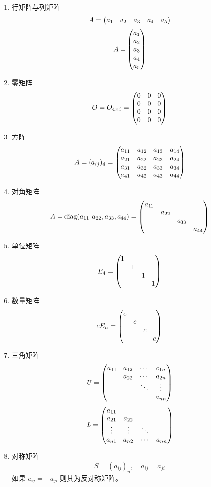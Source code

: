 \documentclass{ctexbook}
\begin{document}
\begin{definition}[常见矩阵]
    \begin{enumerate}
        \item 行矩阵与列矩阵
        \begin{equation}
            A=\mqty(\xmat*{a}{1}{5})
        \end{equation}
        \begin{equation}
            A=\mqty(\xmat*{a}{5}{1})
        \end{equation}
        \item 零矩阵
        \begin{equation}
            O=O_{4\times 3}=\mqty(\zmat{4}{3})
        \end{equation}
        \item 方阵
        \begin{equation}
            A=(a_{ij})_4=\mqty(\xmat*{a}{4}{4})
        \end{equation}
        \item 对角矩阵
        \begin{equation}
            A=\textnormal{diag}(a_{11},a_{22},a_{33},a_{44})=\mqty(\dmat{a_{11},a_{22},a_{33},a_{44}})
        \end{equation}
        \item 单位矩阵
        \begin{equation}
            E_4=\mqty(\dmat{1,1,1,1})
        \end{equation}
        \item 数量矩阵
        \begin{equation}
            cE_n=\mqty(\dmat{c,c,c,c})
        \end{equation}
        \item 三角矩阵
        \begin{equation}
            U=\mqty(a_{11} & a_{12} & \cdots & c_{1n}\\ & a_{22} & \cdots & a_{2n} \\ & & \ddots & \vdots\\ & & & a_{nn})
        \end{equation}
        \begin{equation}
            L=\mqty(a_{11} &  &  & \\ a_{21} & a_{22} &  & \\ \vdots & \vdots & \ddots & \\ a_{n1} & a_{n2} & \cdots & a_{nn})
        \end{equation}
        \item 对称矩阵
        \begin{equation}
            S=(a_{ij})_n,\quad a_{ij}=a_{ji}
        \end{equation}
        如果 $a_{ij}=-a_{ji}$ 则其为反对称矩阵。
    \end{enumerate}
\end{definition}
\end{document}
